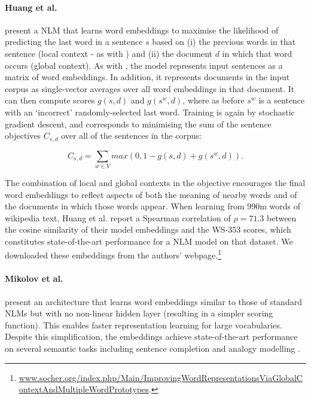 \documentclass[fullname]{clv2}
\begin{document}
 \paragraph{\bf Huang et al.}

 present a NLM that learns word embeddings to maximise the likelihood of predicting the last word in a sentence \(s\) based on (i) the previous words in that sentence (local context - as with ) and (ii) the document \( d\) in which that word occurs (global context). As with , the model represents input sentences as a matrix of word embeddings. In addition, it represents documents in the input corpus as single-vector averages over all word embeddings in that document. It can then compute scores \(g(s,d )\) and \(g(s^w, d) \), where as before \(s^w\) is a sentence with an `incorrect' randomly-selected last word. Training is again by stochastic gradient descent, and corresponds to minimising the sum of the sentence objectives \(C_{s,d} \) over all of the sentences in the corpus:

\[ C_{s,d}  = \sum_{w \in V} max(0,1-g(s,d) + g(s^w,d)). \]

The combination of local and global contexts in the objective encourages the final word embeddings to reflect aspects of both the meaning of nearby words and of the documents in which those words appear. When learning from 990m words of wikipedia text, Huang et al. report a Spearman correlation of \(\rho = 71.3\) between the cosine similarity of their model embeddings and the WS-353 scores, which constitutes state-of-the-art performance for a NLM model on that dataset. We downloaded these embeddings from the authors' webpage.\footnote{\url{www.socher.org/index.php/Main/ImprovingWordRepresentationsViaGlobalContextAndMultipleWordPrototypes}.}

\paragraph{\bf Mikolov et al.}

 present an architecture that learns word embeddings similar to those of standard NLMs but with no non-linear hidden layer (resulting in a simpler scoring function). This enables faster representation learning for large vocabularies. Despite this simplification, the embeddings achieve state-of-the-art performance on several semantic tasks including sentence completion and analogy modelling \cite{mikolov2013efficient,mikolov2013distributed}.   
\end{document}
